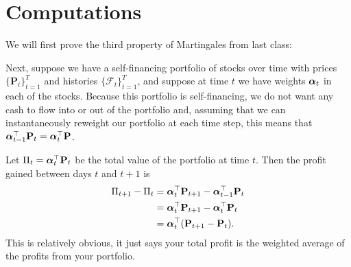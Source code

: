 \documentclass[12pt]{report}
\begin{document}
\section{Computations}
We will first prove the third property of Martingales from last class:

Next, suppose we have a self-financing portfolio of stocks over time with prices $\{\mathbf P_t\}_{t=1}^T$ and histories $\{\mathcal F_t\}_{t=1}^T$, and suppose at time $t$ we have weights $\boldsymbol{\alpha}_t$ in each of the stocks. Because this portfolio is self-financing, we do not want any cash to flow into or out of the portfolio and, assuming that we can instantaneously reweight our portfolio at each time step, this means that $\boldsymbol{\alpha}_{t-1}^\top\mathbf P_t = \boldsymbol{\alpha}_t^\top\mathbf P$.

Let $\Pi_t=\boldsymbol{\alpha}_t^\top\mathbf P_t$ be the total value of the portfolio at time $t$. Then the profit gained between days $t$ and $t+1$ is \begin{align*}
	\Pi_{t+1}-\Pi_t &= \boldsymbol{\alpha}_t^\top\mathbf P_{t+1} - \boldsymbol{\alpha}_{t-1}^\top\mathbf P_t \\
					&= \boldsymbol{\alpha}_t^\top\mathbf P_{t+1} - \boldsymbol{\alpha}_t^\top\mathbf P_t \\
					&= \boldsymbol{\alpha}_t^\top(\mathbf P_{t+1}-\mathbf P_t).
\end{align*} This is relatively obvious, it just says your total profit is the weighted average of the profits from your portfolio.
\end{document}
